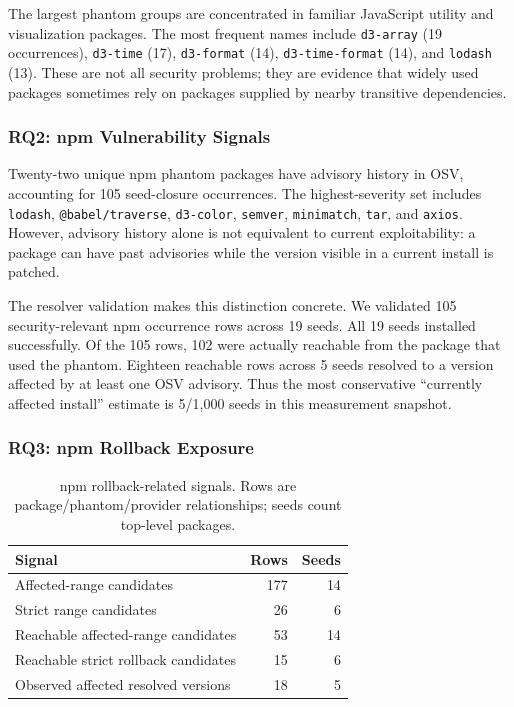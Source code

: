 \documentclass[letterpaper,twocolumn,10pt]{article}
\newcommand{\npm}{npm\xspace}
\begin{document}
The largest phantom groups are concentrated in familiar JavaScript utility and
visualization packages.  The most frequent names include \texttt{d3-array} (19
occurrences), \texttt{d3-time} (17), \texttt{d3-format} (14),
\texttt{d3-time-format} (14), and \texttt{lodash} (13).  These are not all
security problems; they are evidence that widely used packages sometimes rely on
packages supplied by nearby transitive dependencies.

\subsubsection{RQ2: npm Vulnerability Signals}

Twenty-two unique \npm phantom packages have advisory history in OSV, accounting
for 105 seed-closure occurrences.  The highest-severity set includes
\texttt{lodash}, \texttt{@babel/traverse}, \texttt{d3-color},
\texttt{semver}, \texttt{minimatch}, \texttt{tar}, and \texttt{axios}.  However,
advisory history alone is not equivalent to current exploitability: a package
can have past advisories while the version visible in a current install is
patched.

The resolver validation makes this distinction concrete.  We validated 105
security-relevant \npm occurrence rows across 19 seeds.  All 19 seeds installed
successfully.  Of the 105 rows, 102 were actually reachable from the package
that used the phantom.  Eighteen reachable rows across 5 seeds resolved to a
version affected by at least one OSV advisory.  Thus the most conservative
``currently affected install'' estimate is 5/1,000 seeds in this measurement
snapshot.

\subsubsection{RQ3: npm Rollback Exposure}

\begin{table}[t]
\centering
\small
\begin{tabular}{lrr}
\toprule
Signal & Rows & Seeds \\
\midrule
Affected-range candidates & 177 & 14 \\
Strict range candidates & 26 & 6 \\
Reachable affected-range candidates & 53 & 14 \\
Reachable strict rollback candidates & 15 & 6 \\
Observed affected resolved versions & 18 & 5 \\
\bottomrule
\end{tabular}
\caption{npm rollback-related signals. Rows are package/phantom/provider
relationships; seeds count top-level packages.}
\label{tab:rollback}
\end{table}
\end{document}
